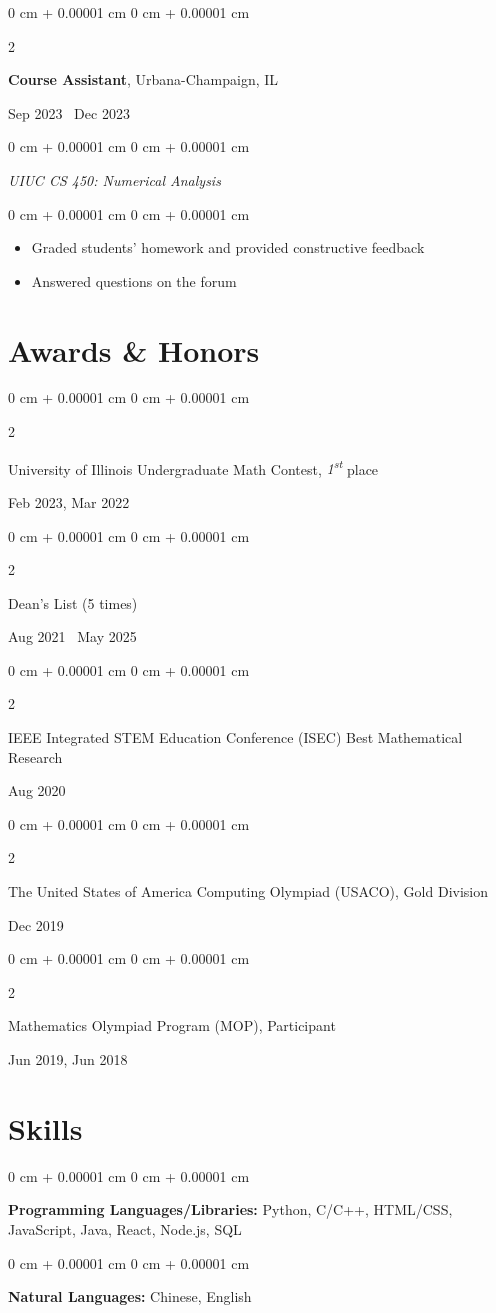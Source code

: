 \documentclass[10pt, letterpaper]{article}
\newenvironment{highlights}{
    \begin{itemize}[
        topsep=0.10 cm,
        parsep=0.10 cm,
        partopsep=0pt,
        itemsep=0pt,
        leftmargin=0 cm + 10pt
    ]
}{
    \end{itemize}
} %
\newenvironment{onecolentry}{
    \begin{adjustwidth}{
        0 cm + 0.00001 cm
    }{
        0 cm + 0.00001 cm
    }
}{
    \end{adjustwidth}
} %
\newenvironment{twocolentry}[2][]{
    \onecolentry
    \def\secondColumn{#2}
    \setcolumnwidth{\fill, 4.5 cm}
    \begin{paracol}{2}
}{
    \switchcolumn \raggedleft \secondColumn
    \end{paracol}
    \endonecolentry
} %
\begin{document}
    \begin{twocolentry}{Sep 2023 \textendash\ Dec 2023}
        \textbf{Course Assistant}, Urbana-Champaign, IL
    \end{twocolentry}

    \vspace{0.10 cm}
    \begin{onecolentry}
        \textit{UIUC CS 450: Numerical Analysis}
    \end{onecolentry}

    \vspace{0.10 cm}
    \begin{onecolentry}
    \begin{highlights}
        \item Graded students' homework and provided constructive feedback
        \item Answered questions on the forum
    \end{highlights}
    \end{onecolentry}


\section{Awards \& Honors}
    \begin{twocolentry}{Feb 2023, Mar 2022}
        University of Illinois Undergraduate Math Contest, \textit{1\textsuperscript{st}} place
    \end{twocolentry}

    \vspace{0.10 cm}
    \begin{twocolentry}{Aug 2021 \textendash\ May 2025}
        Dean's List (5 times)
    \end{twocolentry}

    \vspace{0.10 cm}
    \begin{twocolentry}{Aug 2020}
        IEEE Integrated STEM Education Conference (ISEC) Best Mathematical Research
    \end{twocolentry}

    \vspace{0.20 cm}
    \begin{twocolentry}{Dec 2019}
        The United States of America Computing Olympiad (USACO), Gold Division
    \end{twocolentry}

    \vspace{0.20 cm}
    \begin{twocolentry}{Jun 2019, Jun 2018}
        Mathematics Olympiad Program (MOP), Participant
    \end{twocolentry}
    
\section{Skills}
    \begin{onecolentry}
        \textbf{Programming Languages/Libraries:} Python, C/C++, HTML/CSS, JavaScript, Java, React, Node.js, SQL
    \end{onecolentry}

    \vspace{0.2 cm}

    \begin{onecolentry}
        \textbf{Natural Languages:} Chinese, English
    \end{onecolentry}
\end{document}
